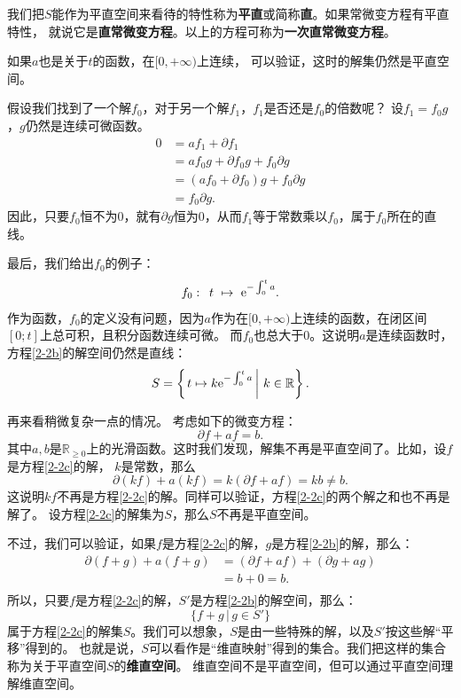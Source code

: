 \documentclass[12pt,UTF8]{ctexbook}
\begin{document}
我们把$S$能作为平直空间来看待的特性称为\textbf{平直}或简称\textbf{直}。如果常微变方程有平直特性，
就说它是\textbf{直常微变方程}。以上的方程可称为\textbf{一次直常微变方程}。

如果$a$也是关于$t$的函数，在$[0,+\infty)$上连续，
可以验证，这时的解集仍然是平直空间。

假设我们找到了一个解$f_0$，对于另一个解$f_1$，$f_1$是否还是$f_0$的倍数呢？
设$f_1 = f_0 g$，$g$仍然是连续可微函数。
\begin{align*}
    0 &= af_1 + \partial f_1 \\
    &= a f_0 g + \partial f_0 g + f_0 \partial g \\
    &= (af_0 + \partial f_0) g + f_0 \partial g \\
    &= f_0 \partial g.
\end{align*}
因此，只要$f_0$恒不为$0$，就有$\partial g$恒为$0$，从而$f_1$等于常数乘以$f_0$，属于$f_0$所在的直线。

最后，我们给出$f_0$的例子：
$$ f_0: \,\,\, t\,\, \mapsto \,\, \mathrm{e}^{-\int_0^t a}. $$
作为函数，$f_0$的定义没有问题，因为$a$作为在$[0,+\infty)$上连续的函数，在闭区间$[0; t]$上总可积，且积分函数连续可微。
而$f_0$也总大于$0$。这说明$a$是连续函数时，方程\eqref{2-2b}的解空间仍然是直线：
$$S = \left\{\left.t\mapsto k\mathrm{e}^{-\int_0^t a} \, \right| \, k\in\mathbb{R}\right\}.$$

再来看稍微复杂一点的情况。
考虑如下的微变方程：
\begin{equation}
    \partial f + a f = b. \label{2-2c}
\end{equation}
其中$a,b$是$\mathbb{R}_{\geqslant 0}$上的光滑函数。这时我们发现，解集不再是平直空间了。比如，设$f$是方程\eqref{2-2c}的解，
$k$是常数，那么
$$\partial (kf) + a (kf) = k (\partial f + a f) = kb \neq b.$$
这说明$kf$不再是方程\eqref{2-2c}的解。同样可以验证，方程\eqref{2-2c}的两个解之和也不再是解了。
设方程\eqref{2-2c}的解集为$S$，那么$S$不再是平直空间。

不过，我们可以验证，如果$f$是方程\eqref{2-2c}的解，$g$是方程\eqref{2-2b}的解，那么：
\begin{align*}
    \partial (f + g) + a (f + g) &= (\partial f + a f) + (\partial g + a g) \\
    &= b + 0 = b. \\ 
\end{align*}
所以，只要$f$是方程\eqref{2-2c}的解，$S'$是方程\eqref{2-2b}的解空间，那么：
$$ \{f + g \, | \, g\in S'\} $$
属于方程\eqref{2-2c}的解集$S$。我们可以想象，$S$是由一些特殊的解，以及$S'$按这些解“平移”得到的。
也就是说，$S$可以看作是“维直映射”得到的集合。我们把这样的集合称为关于平直空间$S$的\textbf{维直空间}。
维直空间不是平直空间，但可以通过平直空间理解维直空间。
\end{document}
